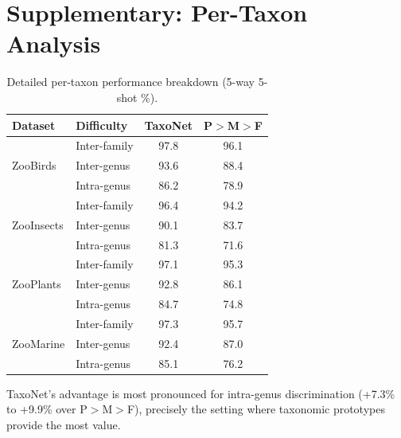 \section{Supplementary: Per-Taxon Analysis}

\label{app:per_taxon}

\begin{table}[H]
\centering
\caption{Detailed per-taxon performance breakdown (5-way 5-shot \%).}
\label{tab:per_taxon}
\begin{tabular}{llcc}
\toprule
\textbf{Dataset} & \textbf{Difficulty} & \textbf{TaxoNet} &
  \textbf{P$>$M$>$F} \\
\midrule
\multirow{3}{*}{ZooBirds}
  & Inter-family & 97.8 & 96.1 \\
  & Inter-genus & 93.6 & 88.4 \\
  & Intra-genus & 86.2 & 78.9 \\
\midrule
\multirow{3}{*}{ZooInsects}
  & Inter-family & 96.4 & 94.2 \\
  & Inter-genus & 90.1 & 83.7 \\
  & Intra-genus & 81.3 & 71.6 \\
\midrule
\multirow{3}{*}{ZooPlants}
  & Inter-family & 97.1 & 95.3 \\
  & Inter-genus & 92.8 & 86.1 \\
  & Intra-genus & 84.7 & 74.8 \\
\midrule
\multirow{3}{*}{ZooMarine}
  & Inter-family & 97.3 & 95.7 \\
  & Inter-genus & 92.4 & 87.0 \\
  & Intra-genus & 85.1 & 76.2 \\
\bottomrule
\end{tabular}
\end{table}

TaxoNet's advantage is most pronounced for intra-genus discrimination
(+7.3\% to +9.9\% over P$>$M$>$F), precisely the setting where
taxonomic prototypes provide the most value.


